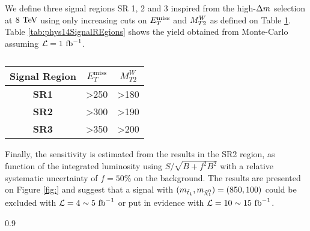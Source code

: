         \begin{table}
            \centering
             
            \caption{ \label{tab:phys14Preselection}}
        \end{table}

        We define three signal regions SR 1, 2 and 3 inspired from the high-$\Delta m$
        selection at $8~\text{TeV}$ using only increasing cuts on $E_T^\text{miss}$ and $M_{T2}^W$ as defined
        on Table \ref{tab:phys14Cuts}. Table \ref{tab:phys14SignalREgions} shows the yield 
        obtained from Monte-Carlo assuming $\mathcal{L} = 1~\text{fb}^{-1}$. 

        \begin{table}
            \centering
            \begin{tabular}{c|cc}
                \textbf{Signal Region} & $E_T^\text{miss}$ & $M_{T2}^W$ \\
                \hline
                \textbf{SR1}           & >250 & >180 \\
                \textbf{SR2}           & >300 & >190 \\
                \textbf{SR3}           & >350 & >200 \\
            \end{tabular}
            \caption{ \label{tab:phys14Cuts}}
        \end{table}

        \begin{table}
            \centering
             
            \caption{ \label{tab:phys14SignalRegions}}
        \end{table}

       Finally, the sensitivity is estimated from the results in the SR2 region, as function 
       of the integrated luminosity using $S / \sqrt{B + f^2 B^2}$ with a relative systematic 
       uncertainty of $f = 50\%$ on the background. The results are presented on Figure 
       \ref{fig:} and suggest that a signal with $(m_{\tilde{t}_1}, m_{\tilde{\chi}_1^0}) = (850,100)$ 
       could be excluded with $\mathcal{L} = 4\sim5~\text{fb}^{-1}$ or put in evidence with 
       $\mathcal{L} = 10\sim15~\text{fb}^{-1}$.

                         {0.9}
                         {}

